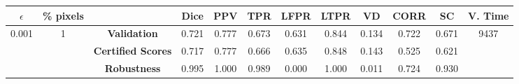 \begin{longtable}{ c  c | c | c  c  c  c  c  c  c c c}
\toprule \textbf{$\epsilon$} & \textbf{\% pixels} & & \textbf{Dice} & \textbf{PPV} & \textbf{TPR} & \textbf{LFPR} & \textbf{LTPR} & \textbf{VD} & \textbf{CORR} & \textbf{SC} & \textbf{V. Time} \\
\midrule 
\multirow{3}{*}{0.001}  & \multirow{3}{*}{1} &\textbf{Validation} & 0.721 & 0.777 & 0.673 & 0.631 & 0.844 & 0.134 & 0.722 & 0.671 & \multirow{3}{*}{9437} \\
 & & \textbf{Certified Scores} & 0.717 & 0.777 & 0.666 & 0.635 & 0.848 & 0.143 & 0.525 & 0.621 & \\
& & \textbf{Robustness} & 0.995 & 1.000 & 0.989 & 0.000 & 1.000 & 0.011 & 0.724 & 0.930 & \\
\end{longtable}